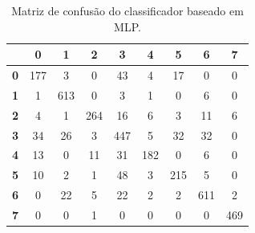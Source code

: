 \begin{table}[H]
	\centering
	\begin{tabular}{c||c|c|c|c|c|c|c|c|}
		\cline{2-9}
		\textbf{}                        & \textbf{0} & \textbf{1} & \textbf{2} & \textbf{3} & \textbf{4} & \textbf{5} & \textbf{6} & \textbf{7} \\ \hline \hline
		\multicolumn{1}{|c||}{\textbf{0}} & 177        & 3          & 0          & 43         & 4          & 17         & 0          & 0          \\ \hline
		\multicolumn{1}{|c||}{\textbf{1}} & 1          & 613        & 0          & 3          & 1          & 0          & 6          & 0          \\ \hline
		\multicolumn{1}{|c||}{\textbf{2}} & 4          & 1          & 264        & 16         & 6          & 3          & 11         & 6          \\ \hline
		\multicolumn{1}{|c||}{\textbf{3}} & 34         & 26         & 3          & 447        & 5          & 32         & 32         & 0          \\ \hline
		\multicolumn{1}{|c||}{\textbf{4}} & 13         & 0          & 11         & 31         & 182        & 0          & 6          & 0          \\ \hline
		\multicolumn{1}{|c||}{\textbf{5}} & 10         & 2          & 1          & 48         & 3          & 215        & 5          & 0          \\ \hline
		\multicolumn{1}{|c||}{\textbf{6}} & 0          & 22         & 5          & 22         & 2          & 2          & 611        & 2          \\ \hline
		\multicolumn{1}{|c||}{\textbf{7}} & 0          & 0          & 1          & 0          & 0          & 0          & 0          & 469        \\ \hline
	\end{tabular}
	\caption{Matriz de confusão do classificador baseado em MLP.}
	\label{tab:mc_MLP}
\end{table}

